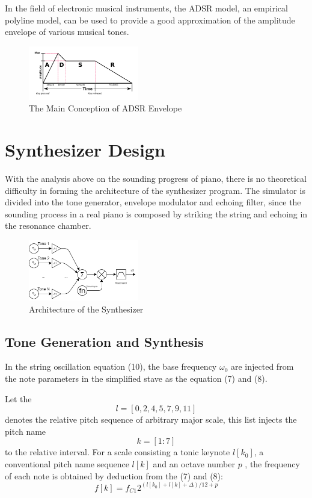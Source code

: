 \documentclass[conference]{IEEEtran}
\begin{document}
In the field of electronic musical instruments, the ADSR model, an empirical polyline model, can be used to provide a good approximation of the amplitude envelope of various musical tones.

\begin{figure}[htpb]
	\centering
	\includegraphics[width=0.43\textwidth]{adsr_concep.png}
	\caption{The Main Conception of ADSR Envelope}
	\label{fig:adsr_concep.png}
\end{figure}

\section{Synthesizer Design}

With the analysis above on the sounding progress of piano, there is no theoretical difficulty in forming the architecture of the synthesizer program. The simulator is divided into the tone generator, envelope modulator and echoing filter, since the sounding process in a real piano is composed by striking the string and echoing in the resonance chamber.

\begin{figure}[htpb]
	\centering
	\includegraphics[width=0.43\textwidth]{synth_arch.png}
	\caption{Architecture of the Synthesizer}
	\label{fig:synth_arch.png}
\end{figure}

\subsection{Tone Generation and Synthesis}
In the string oscillation equation (10), the base frequency \( \omega_{0}  \) are injected from the note parameters in the simplified stave as the equation (7) and (8).

Let the
\begin{equation}
	l=[0,2,4,5,7,9,11]
\end{equation}
denotes the relative pitch sequence of arbitrary major scale, this list injects the pitch name
\begin{equation}
	k=[1:7]
\end{equation}
to the relative interval. For a scale consisting a tonic keynote \( l[k_{0}]  \), a conventional pitch name sequence \( l[k] \)  and an octave number \( p \) , the frequency of each note is obtained by deduction from the (7) and (8):
\begin{equation}
	f[k]=f_{C1}2^{(l[k_{0}]+l[k]+\Delta)/12+p}
\end{equation}
\end{document}
